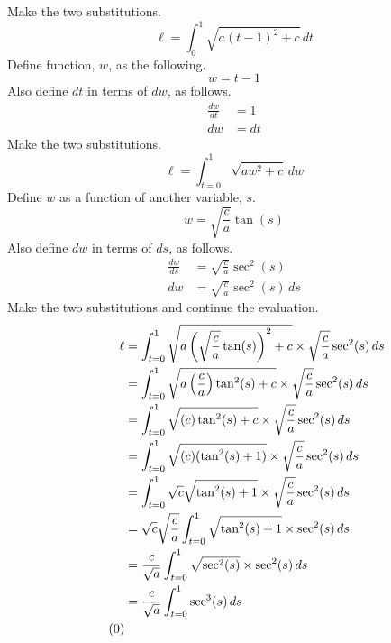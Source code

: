 \documentclass{article}
\begin{document}
Make the two substitutions.
\begin{equation*}
    \ell = \int_0^1\sqrt{a(t-1)^2+c}\, dt
\end{equation*}
Define function, $w$, as the following.
\begin{equation}\label{eqn:w}
    w=t-1
\end{equation}
Also define $dt$ in terms of $dw$, as follows.
\begin{align*}
    \frac{dw}{dt} &= 1\\
    dw &= dt
\end{align*}
Make the two substitutions.
\begin{equation*}
    \ell = \int_{t=0}^1\sqrt{aw^2+c}\, dw
\end{equation*}
Define $w$ as a function of another variable, $s$.
\begin{equation*}
    w=\sqrt{\frac{c}{a}}\tan(s)
\end{equation*}
Also define $dw$ in terms of $ds$, as follows.
\begin{align*}
    \frac{dw}{ds} &= \sqrt{\frac{c}{a}}\sec^2(s)\\
    dw &= \sqrt{\frac{c}{a}}\sec^2(s)\, ds
\end{align*}
Make the two substitutions and continue the evaluation.
\begin{align*}
    \ell &= \int_{t=0}^1\sqrt{a\left(\sqrt{\frac{c}{a}}\tan(s)\right)^2+c}\times\sqrt{\frac{c}{a}}\sec^2(s)\, ds\\
    &= \int_{t=0}^1\sqrt{a\left(\frac{c}{a}\right)\tan^2(s)+c}\times\sqrt{\frac{c}{a}}\sec^2(s)\, ds\\
    &= \int_{t=0}^1\sqrt{(c)\tan^2(s)+c}\times\sqrt{\frac{c}{a}}\sec^2(s)\, ds\\
    &= \int_{t=0}^1\sqrt{(c)(\tan^2(s)+1)}\times\sqrt{\frac{c}{a}}\sec^2(s)\, ds\\
    &= \int_{t=0}^1\sqrt{c}\sqrt{\tan^2(s)+1}\times\sqrt{\frac{c}{a}}\sec^2(s)\, ds\\
    &= \sqrt{c}\sqrt{\frac{c}{a}}\int_{t=0}^1\sqrt{\tan^2(s)+1}\times\sec^2(s)\, ds\\
    &= \frac{c}{\sqrt{a}}\int_{t=0}^1\sqrt{\sec^2(s)}\times\sec^2(s)\, ds\\
    &= \frac{c}{\sqrt{a}}\int_{t=0}^1\sec^3(s)\, ds\\\tag{\theequation}\label{eqn:break}
    \stepcounter{equation}
\end{align*}
\end{document}
